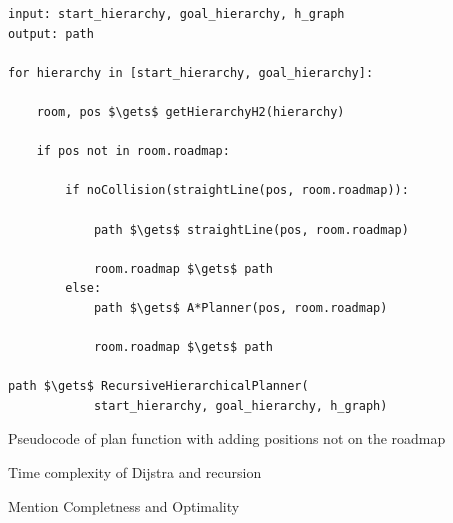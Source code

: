 \begin{lstlisting}[float=h]
input: start_hierarchy, goal_hierarchy, h_graph
output: path

for hierarchy in [start_hierarchy, goal_hierarchy]:

    room, pos $\gets$ getHierarchyH2(hierarchy)
    
    if pos not in room.roadmap:
    
        if noCollision(straightLine(pos, room.roadmap)):
        
            path $\gets$ straightLine(pos, room.roadmap)
            
            room.roadmap $\gets$ path
        else:
            path $\gets$ A*Planner(pos, room.roadmap)
            
            room.roadmap $\gets$ path

path $\gets$ RecursiveHierarchicalPlanner(
            start_hierarchy, goal_hierarchy, h_graph)

\end{lstlisting}

Pseudocode of plan function with adding positions not on the roadmap

Time complexity of Dijstra and recursion

Mention Completness and Optimality




